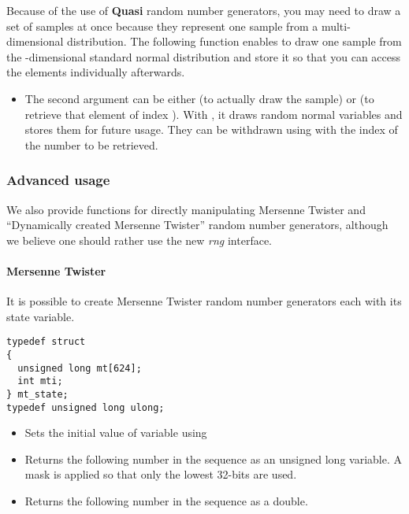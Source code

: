 Because of the use of {\bf Quasi} random number generators, you may need to
draw a set of samples at once because they represent one sample from a
multi-dimensional distribution. The following function enables to draw one
sample from the -dimensional standard normal distribution and
store it so that you can access the elements individually afterwards.
\begin{itemize}
\item {}
  \sshortdescribe The second argument can be either  (to actually
  draw the sample) or  (to retrieve that element of index
  ). With , it draws  random normal variables
  and stores them for future usage. They can be withdrawn using 
  with the index of the number to be retrieved.
\end{itemize}


\subsubsection{Advanced usage}

We also provide functions for directly manipulating Mersenne Twister and
``Dynamically created Mersenne Twister'' random number generators, although we
believe one should rather use the new {\em rng} interface.

\paragraph{Mersenne Twister}

It is possible to create Mersenne Twister random number generators each with
its state variable.
\begin{verbatim}
typedef struct
{
  unsigned long mt[624];
  int mti;
} mt_state;
typedef unsigned long ulong;
\end{verbatim}

\begin{itemize}
\item {}
  \sshortdescribe Sets the initial value of variable  using 
\item {}
  \sshortdescribe Returns the following number in the sequence as an unsigned
  long variable. A mask is applied so that only the lowest 32-bits are used.
\item {}
  \sshortdescribe Returns the following number in the sequence as a double.
\end{itemize}


